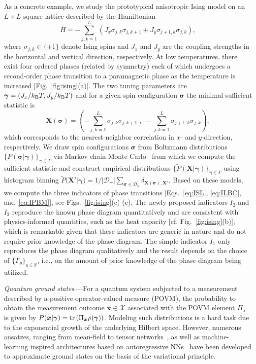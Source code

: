 \documentclass[twocolumn,aps,prl,superscriptaddress,tightlines,nofootinbib]{revtex4-2}
\begin{document}
\indent As a concrete example, we study the prototypical anisotropic Ising model on an $L \times L$ square lattice described by the Hamiltonian
\begin{equation}\label{eq:ising_hamiltonian}
H= -\sum_{j,k=1}^L  \left( J_x \sigma_{j,k} \sigma_{j, k+1} + J_y \sigma_{j+1,k} \sigma_{j, k} \right),
\end{equation}
where $\sigma_{j,k} \in \{ \pm 1\}$ denote Ising spins and $J_x$ and $J_y$ are the coupling strengths in the horizontal and vertical direction, respectively. At low temperatures, there exist four ordered phases (related by symmetry) each of which undergoes a second-order phase transition to a paramagnetic phase as the temperature is increased [Fig.~\ref{fig:ising}(a)]. The two tuning parameters are $\bm{\gamma} = \left( J_x/k_{\rm B}T, J_y/k_{\rm B}T \right)$ and for a given spin configuration $\bm{\sigma}$ the minimal sufficient statistic is
\begin{equation*}
    \bm{X}(\bm{\sigma}) = \left( -\sum_{j,k=1}^L \sigma_{j,k} \sigma_{j, k+1}\;,\; -\sum_{j,k=1}^L \sigma_{j+1,k} \sigma_{j, k} \right),
\end{equation*}
which corresponds to the nearest-neighbor correlation in $x$- and $y$-direction, respectively. We draw spin configurations $\bm{\sigma}$ from Boltzmann distributions $\{ P(\bm{\sigma}|\bm{\gamma})\}_{\bm{\gamma} \in \Gamma}$ via Markov chain Monte Carlo~\cite{suppl} from which we compute the sufficient statistic and construct empirical distributions  $\{ \tilde{P}(\bm{X}|\bm{\gamma})\}_{\bm{\gamma} \in \Gamma}$ using histogram binning $\tilde{P}(\bm{X}'|\bm{\gamma}) = 1/|\mathcal{D}_{\bm{\gamma}}|\sum_{\bm{\sigma} \in \mathcal{D}_{\bm{\gamma}}} \delta_{\bm{X}(\bm{\sigma}),\bm{X}'}$. Based on these models, we compute the three indicators of phase transitions [Eqs.~\eqref{eq:ISL}, \eqref{eq:ILBC}, and~\eqref{eq:IPBM}], see Figs.~\ref{fig:ising}(c)-(e). The newly proposed indicators $I_{2}$ and $I_{3}$ reproduce the known phase diagram quantitatively and are consistent with physics-informed quantities, such as the heat capacity [cf. Fig.~\ref{fig:ising}(b)], which is remarkable given that these indicators are generic in nature and do not require prior knowledge of the phase diagram. The simple indicator $I_{1}$ only reproduces the phase diagram qualitatively and the result depends on the choice of $\{\Gamma_{y}\}_{y\in \mathcal{Y}}$, i.e., on the amount of prior knowledge of the phase diagram being utilized.

\indent \emph{Quantum ground states}.---For a quantum system subjected to a measurement described by a positive operator-valued measure (POVM), the probability to obtain the measurement outcome $\bm{x} \in \mathcal{X}$ associated with the POVM element $\Pi_{\bm{x}}$ is given by $P(\bm{x}|\bm{\gamma}) = {\rm tr}\left(\Pi_{\bm{x}} \rho(\bm{\gamma})\right)$. Modeling such distributions is a hard task due to the exponential growth of the underlying Hilbert space. However, numerous ansatzes, ranging from mean-field to tensor networks~\cite{schollwock:2011}, as well as machine-learning inspired architectures based on autoregressive NNs~\cite{sharir:2020,hibat:2020} have been developed to approximate ground states on the basis of the variational principle. 
\end{document}

